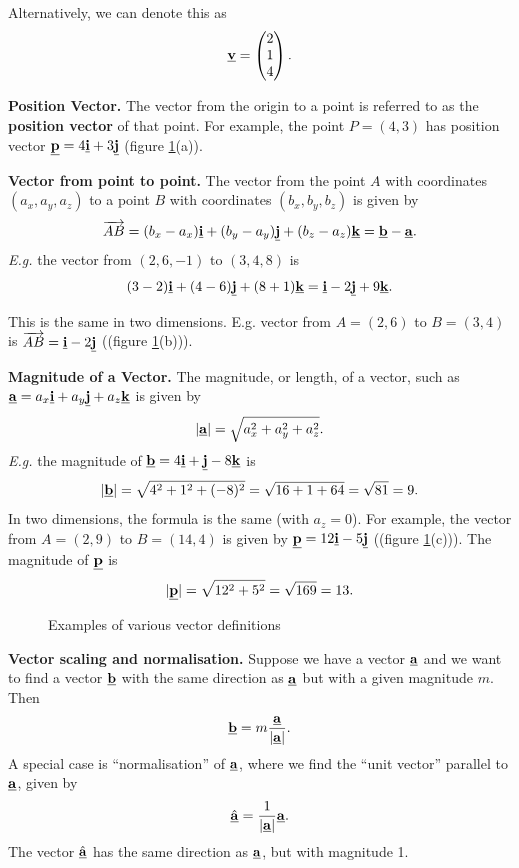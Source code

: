 Alternatively, we can denote this as
\[
\underline{\mathbf{v}}=\begin{pmatrix}2\\1\\4\end{pmatrix}.
\]

\textbf{Position Vector.} The vector from the origin to a point is referred to as the \textbf{position vector} of that point. For example, the point $P=(4,3)$ has position vector $\underline{\mathbf{p}}=4\underline{\mathbf{i}}+3\underline{\mathbf{j}}$ (figure \ref{fig:vec_types}(a)).

\textbf{Vector from point to point.} The vector from the point $A$ with coordinates $(a_x,a_y,a_z)$ to a point $B$ with coordinates $(b_x,b_y,b_z)$ is given by
\begin{equation}
\overrightarrow{AB}=(b_x-a_x)\underline{\mathbf{i}}+(b_y-a_y)\underline{\mathbf{j}}+(b_z-a_z)\underline{\mathbf{k}}
=\underline{\mathbf{b}}-\underline{\mathbf{a}}.
\end{equation}
\emph{E.g.} the vector from $(2,6,-1)$ to $(3,4,8)$ is
\[
(3-2)\underline{\mathbf{i}}+(4-6)\underline{\mathbf{j}}+(8+1)\underline{\mathbf{k}}
=\underline{\mathbf{i}}-2\underline{\mathbf{j}}+9\underline{\mathbf{k}}.
\]

This is the same in two dimensions. E.g. vector from $A=(2,6)$ to $B=(3,4)$ is $\overrightarrow{AB}=\underline{\mathbf{i}}-2\underline{\mathbf{j}}$ ((figure \ref{fig:vec_types}(b))).

\textbf{Magnitude of a Vector.} The magnitude, or length, of a vector, such as $\underline{\mathbf{a}}=a_x\underline{\mathbf{i}}+a_y\underline{\mathbf{j}}+a_z\underline{\mathbf{k}}$ is given by
\begin{equation}
\lvert\underline{\mathbf{a}}\rvert=\sqrt{a_x^2+a_y^2+a_z^2}.    
\end{equation}
\textit{E.g.} the magnitude of $\underline{\mathbf{b}}=4\underline{\mathbf{i}}+\underline{\mathbf{j}}-8\underline{\mathbf{k}}$ is
\[
\lvert\underline{\mathbf{b}}\rvert=\sqrt{4^2+1^2+(-8)^2}=\sqrt{16+1+64}=\sqrt{81}=9.
\]
In two dimensions, the formula is the same (with $a_z=0$). For example, the vector from $A=(2,9)$ to $B=(14,4)$ is given by $\underline{\mathbf{p}}=12\underline{\mathbf{i}}-5\underline{\mathbf{j}}$ ((figure \ref{fig:vec_types}(c))). The magnitude of $\underline{\mathbf{p}}$ is
\[
\lvert\underline{\mathbf{p}}\rvert=\sqrt{12^2+5^2}=\sqrt{169}=13.
\]
\begin{figure}[ht]
    \centering
    \hfill
    \hfill
    \caption{Examples of various vector definitions}
    \label{fig:vec_types}
\end{figure}


\textbf{Vector scaling and normalisation.} Suppose we have a vector $\underline{\mathbf{a}}$ and we want to find a vector $\underline{\mathbf{b}}$ with the same direction as $\underline{\mathbf{a}}$ but with a given magnitude $m$. Then
\begin{align}
    \underline{\mathbf{b}}=m\frac{\underline{\mathbf{a}}}{\lvert\underline{\mathbf{a}}\rvert}.
\end{align}
A special case is ``normalisation'' of $\underline{\mathbf{a}}$, where we find the ``unit vector'' parallel to $\underline{\mathbf{a}}$, given by
\begin{equation}
  \hat{\underline{\mathbf{a}}}=\frac{1}{\lvert\underline{\mathbf{a}}\rvert}\underline{\mathbf{a}}.  
\end{equation}
The vector $\hat{\underline{\mathbf{a}}}$ has the same direction as $\underline{\mathbf{a}}$, but with magnitude 1.

